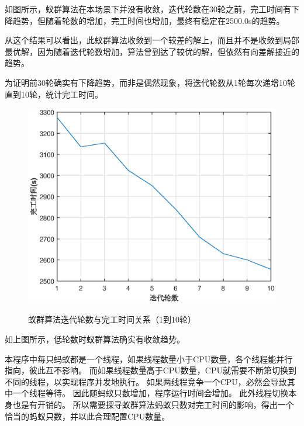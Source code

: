 如图所示，蚁群算法在本场景下并没有收敛，迭代轮数在30轮之前，完工时间有下降趋势，但随着轮数的增加，完工时间也增加，最终有稳定在2500.0s的趋势。

从这个结果可以看出，此蚁群算法收敛到一个较差的解上，而且并不是收敛到局部最优解，因为随着迭代轮数增加，算法曾到达了较优的解，但依然有向差解接近的趋势。

为证明前30轮确实有下降趋势，而非是偶然现象，将迭代轮数从1轮每次递增10轮直到10轮，统计完工时间。

\begin{table}[H]
	\centering
	\caption{蚁群算法迭代轮数与完工时间的关系（小轮数）}
\end{table}

\begin{figure}[H]
	\centering
	\includegraphics[scale=1.00,angle=0]{figures/round_t_small.eps}\\
	\caption{蚁群算法迭代轮数与完工时间关系（1到10轮）}
\end{figure}

如上图所示，低轮数时蚁群算法确实有收敛趋势。

本程序中每只蚂蚁都是一个线程，如果线程数量小于CPU数量，各个线程能并行指向，彼此互不影响。
而如果线程数量高于CPU数量，CPU就需要不断第切换到不同的线程，以实现程序并发地执行。
如果两线程竞争一个CPU，必然会导致其中一个线程等待。
因此随蚂蚁只数增加，程序运行时间会增加。
此外线程切换本身也是有开销的。
所以需要探寻蚁群算法蚂蚁只数对完工时间的影响，得出一个恰当的蚂蚁只数，并以此合理配置CPU数量。

